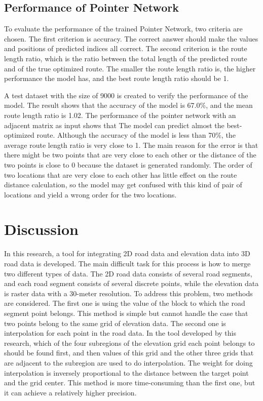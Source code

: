 \documentclass[final-report]{report-template}
\begin{document}
\subsection{Performance of Pointer Network}
To evaluate the performance of the trained Pointer Network, two criteria are chosen. 
The first criterion is accuracy. 
The correct answer should make the values and positions of predicted indices all correct.
The second criterion is the route length ratio, 
which is the ratio between the total length of the predicted route and of the true optimized route.
The smaller the route length ratio is, the higher performance the model has, 
and the best route length ratio should be 1.

A test dataset with the size of 9000 is created to verify the performance of the model. 
The result shows that the accuracy of the model is 67.0\%,
and the mean route length ratio is 1.02.
The performance of the pointer network with an adjacent matrix as input shows that 
The model can predict almost the best-optimized route. 
Although the accuracy of the model is less than 70\%, the average route length ratio is very close to 1.
The main reason for the error is that there might be two points that are very close to each other 
or the distance of the two points is close to 0 because the dataset is generated randomly.
The order of two locations that are very close to each other has little effect on the route distance calculation, 
so the model may get confused with this kind of pair of locations and yield a wrong order for the two locations.

\section {Discussion}
In this research, a tool for integrating 2D road data and elevation data into 3D road data is developed.
The main difficult task for this process is how to merge two different types of data.
The 2D road data consists of several road segments, and each road segment consists of several discrete points, 
while the elevation data is raster data with a 30-meter resolution. 
To address this problem, two methods are considered. 
The first one is using the value of the block to which the road segment point belongs. 
This method is simple but cannot handle the case that two points belong to the same grid of elevation data.
The second one is interpolation for each point in the road data. In the tool developed by this research, 
which of the four subregions of the elevation grid each point belongs to should be found first, 
and then values of this grid and the other three grids that are adjacent to the subregion are used to do interpolation.
The weight for doing interpolation is inversely proportional to the distance between the target point and the grid center.
This method is more time-consuming than the first one, but it can achieve a relatively higher precision.
\end{document}
